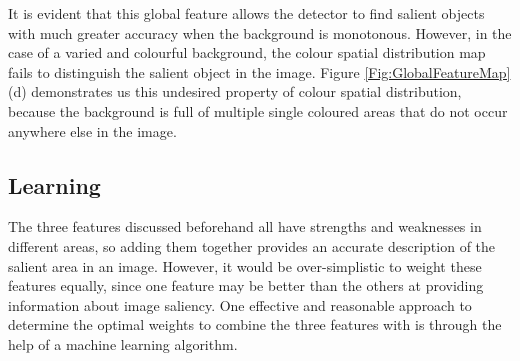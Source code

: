 \documentclass[10pt,twocolumn,letterpaper]{article}
\begin{document}
It is evident that this global feature allows the detector to find salient objects with much greater accuracy when the background is monotonous. However, in the case of a varied and colourful background, the colour spatial distribution map fails to distinguish the salient object in the image. Figure \ref{Fig:GlobalFeatureMap} (d) demonstrates us this undesired property of colour spatial distribution, because the background is full of multiple single coloured areas that do not occur anywhere else in the image.








\newcommand{\bl}{\boldsymbol{\lambda}}
\newcommand{\bt}{\boldsymbol{t}}
\newcommand{\btx}{\boldsymbol{t}_x}
\newcommand{\bphix}{\boldsymbol{\phi}_x}

\subsection{Learning}
The three features discussed beforehand all have strengths and weaknesses in different areas, so adding them together provides an accurate description of the salient area in an image.  However, it would be over-simplistic to weight these features equally, since one feature may be better than the others at providing information about image saliency. One effective and reasonable approach to determine the optimal weights to combine the three features with is through the help of a machine learning algorithm.  
\end{document}

